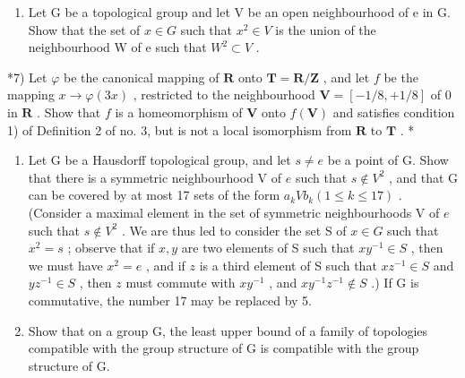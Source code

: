 \begin{enumerate}
\def\labelenumi{\arabic{enumi})}
\setcounter{enumi}{5}
\tightlist
\item
  Let G be a topological group and let V be an open neighbourhood of e in G. Show that the set of \(x \in G\) such that \(x^{2} \in V\) is the union of the neighbourhood W of e such that \(W^{2} \subset V\) .
\end{enumerate}

*7) Let \(\varphi\) be the canonical mapping of \(\mathbf{R}\) onto \(\mathbf{T} = \mathbf{R} / \mathbf{Z}\) , and let \(f\) be the mapping \(x \to \varphi(3x)\) , restricted to the neighbourhood \(\mathbf{V} = [-1/8, +1/8]\) of \(0\) in \(\mathbf{R}\) . Show that \(f\) is a homeomorphism of \(\mathbf{V}\) onto \(f(\mathbf{V})\) and satisfies condition 1) of Definition 2 of no. 3, but is not a local isomorphism from \(\mathbf{R}\) to \(\mathbf{T}\) . *

\begin{enumerate}
\def\labelenumi{\arabic{enumi})}
\setcounter{enumi}{7}
\item
  Let G be a Hausdorff topological group, and let \(s \neq e\) be a point of G. Show that there is a symmetric neighbourhood V of \(e\) such that \(s \notin V^2\) , and that G can be covered by at most 17 sets of the form \(a_k V b_k (1 \leqslant k \leqslant 17)\) . (Consider a maximal element in the set of symmetric neighbourhoods V of \(e\) such that \(s \notin V^2\) . We are thus led to consider the set S of \(x \in G\) such that \(x^2 = s\) ; observe that if \(x, y\) are two elements of S such that \(xy^{-1} \in S\) , then we must have \(x^2 = e\) , and if \(z\) is a third element of S such that \(xz^{-1} \in S\) and \(yz^{-1} \in S\) , then \(z\) must commute with \(xy^{-1}\) , and \(xy^{-1}z^{-1} \notin S\) .) If G is commutative, the number 17 may be replaced by 5.
\item
  Show that on a group G, the least upper bound of a family of topologies compatible with the group structure of G is compatible with the group structure of G.
\end{enumerate}

